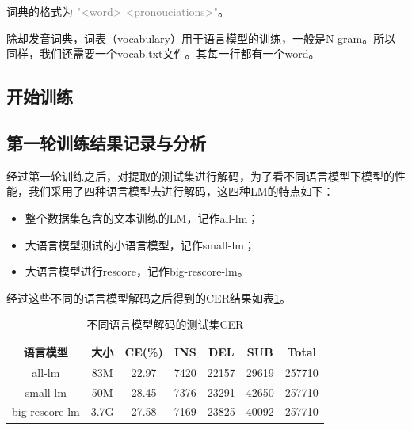 词典的格式为 \textcolor{gray}{"<word> <pronouciations>"}。

除却发音词典，词表（vocabulary）用于语言模型的训练，一般是N-gram。所以同样，我们还需要一个vocab.txt文件。其每一行都有一个word。

\subsection{开始训练}



\subsection{第一轮训练结果记录与分析}
经过第一轮训练之后，对提取的测试集进行解码，为了看不同语言模型下模型的性能，我们采用了四种语言模型去进行解码，这四种LM的特点如下：
\begin{itemize}
	\item 整个数据集包含的文本训练的LM，记作all-lm；
	\item 大语言模型测试的小语言模型，记作small-lm；
	\item 大语言模型进行rescore，记作big-rescore-lm。
\end{itemize}

经过这些不同的语言模型解码之后得到的CER结果如表\ref{tab:lm-decoder}。
\begin{table}[h]
 \centering
 \caption{不同语言模型解码的测试集CER}
	 \begin{tabular*}{1\textwidth}{@{\extracolsep{\fill}}ccccccc}
	 \toprule
		{\bf 语言模型} & {\bf 大小} & {\bf CE(\%)} &{\bf INS} &{\bf DEL}  &{\bf SUB} &{\bf Total}\\
	 \midrule
	   all-lm         &  83M   & 22.97   &   7420 &   22157 & 29619  & 257710 \\
	   small-lm       &  50M   & 28.45   &   7376 &   23291 & 42650  & 257710 \\
	   big-rescore-lm &  3.7G  & 27.58   &   7169 &   23825 & 40092  & 257710 \\
	 \bottomrule
	 \end{tabular*}%
 \label{tab:lm-decoder}%
\end{table}%

